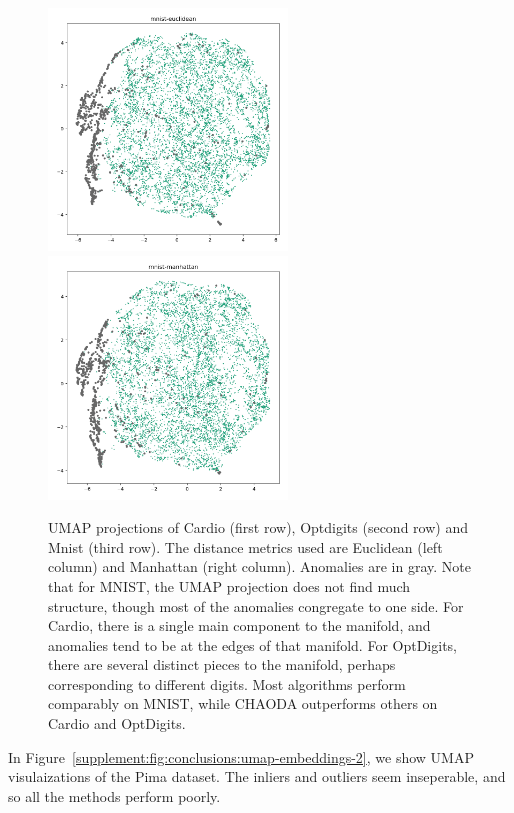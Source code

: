 \documentclass{article}
\begin{document}
\begin{figure}
   \includegraphics[width=2.5in]{images/umaps/mnist-euclidean-umap2d.png}
   \includegraphics[width=2.5in]{images/umaps/mnist-manhattan-umap2d.png}
   \caption{UMAP projections of Cardio (first row), Optdigits (second row) and Mnist (third row).
   The distance metrics used are Euclidean (left column) and Manhattan (right column).
   Anomalies are in gray.
   Note that for MNIST, the UMAP projection does not find much structure, though most of the anomalies congregate to one side.
   For Cardio, there is a single main component to the manifold, and anomalies tend to be at the edges of that manifold.
   For OptDigits, there are several distinct pieces to the manifold, perhaps corresponding to different digits.
   Most algorithms perform comparably on MNIST, while CHAODA outperforms others on Cardio and OptDigits.}
   \label{supplement:fig:conclusions:umap-embeddings-1}
\end{figure}

In Figure~\ref{supplement:fig:conclusions:umap-embeddings-2}, we show UMAP visulaizations of the Pima dataset.
The inliers and outliers seem inseperable, and so all the methods perform poorly.
\end{document}

